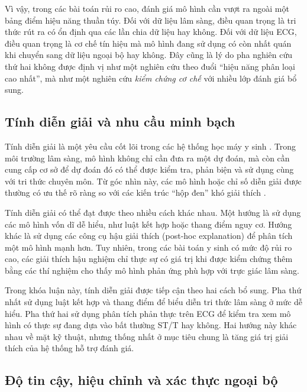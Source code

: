 \blocksep

Vì vậy, trong các bài toán rủi ro cao, đánh giá mô hình cần vượt ra ngoài một bảng điểm hiệu năng thuần túy. Đối với dữ liệu lâm sàng, điều quan trọng là tri thức rút ra có ổn định qua các lần chia dữ liệu hay không. Đối với dữ liệu ECG, điều quan trọng là cơ chế tín hiệu mà mô hình đang sử dụng có còn nhất quán khi chuyển sang dữ liệu ngoại bộ hay không. Đây cũng là lý do pha nghiên cứu thứ hai không được định vị như một nghiên cứu theo đuổi “hiệu năng phân loại cao nhất”, mà như một nghiên cứu \textit{kiểm chứng cơ chế} với nhiều lớp đánh giá bổ sung.

\blocksep

\subsection{Tính diễn giải và nhu cầu minh bạch}

\blocksep

Tính diễn giải là một yêu cầu cốt lõi trong các hệ thống học máy y sinh \cite{Lipton2018}. Trong môi trường lâm sàng, mô hình không chỉ cần đưa ra một dự đoán, mà còn cần cung cấp cơ sở để dự đoán đó có thể được kiểm tra, phản biện và sử dụng cùng với tri thức chuyên môn. Từ góc nhìn này, các mô hình hoặc chỉ số diễn giải được thường có ưu thế rõ ràng so với các kiến trúc “hộp đen” khó giải thích \cite{Rudin2019}.

\blocksep

Tính diễn giải có thể đạt được theo nhiều cách khác nhau. Một hướng là sử dụng các mô hình vốn dĩ dễ hiểu, như luật kết hợp hoặc thang điểm nguy cơ. Hướng khác là sử dụng các công cụ hậu giải thích (post-hoc explanation) để phân tích một mô hình mạnh hơn. Tuy nhiên, trong các bài toán y sinh có mức độ rủi ro cao, các giải thích hậu nghiệm chỉ thực sự có giá trị khi được kiểm chứng thêm bằng các thí nghiệm cho thấy mô hình phản ứng phù hợp với trực giác lâm sàng.

\blocksep

Trong khóa luận này, tính diễn giải được tiếp cận theo hai cách bổ sung. Pha thứ nhất sử dụng luật kết hợp và thang điểm để biểu diễn tri thức lâm sàng ở mức dễ hiểu. Pha thứ hai sử dụng phân tích phản thực trên ECG để kiểm tra xem mô hình có thực sự đang dựa vào bất thường ST/T hay không. Hai hướng này khác nhau về mặt kỹ thuật, nhưng thống nhất ở mục tiêu chung là tăng giá trị giải thích của hệ thống hỗ trợ đánh giá.

\blocksep

\subsection{Độ tin cậy, hiệu chỉnh và xác thực ngoại bộ}

